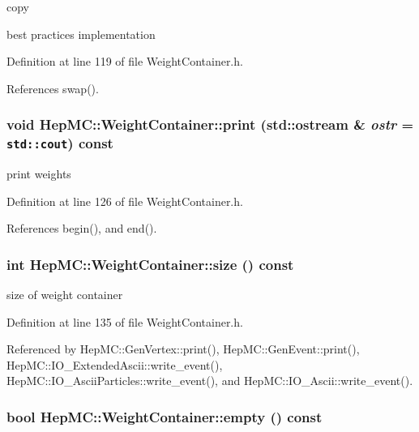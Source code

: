 copy 



best practices implementation 

Definition at line 119 of file Weight\-Container.h.

References swap().
\subsubsection{\setlength{\rightskip}{0pt plus 5cm}void Hep\-MC::Weight\-Container::print (std::ostream \& {\em ostr} = {\tt std::cout}) const\hspace{0.3cm}{\tt  [inline]}}\label{classHepMC_1_1WeightContainer_d3b1b9777a7ab2b600db4113aee2a8a3}


print weights 



Definition at line 126 of file Weight\-Container.h.

References begin(), and end().
\subsubsection{\setlength{\rightskip}{0pt plus 5cm}int Hep\-MC::Weight\-Container::size () const\hspace{0.3cm}{\tt  [inline]}}\label{classHepMC_1_1WeightContainer_43fbe772685a7052693a4bde78a2b93e}


size of weight container 



Definition at line 135 of file Weight\-Container.h.

Referenced by Hep\-MC::Gen\-Vertex::print(), Hep\-MC::Gen\-Event::print(), Hep\-MC::IO\_\-Extended\-Ascii::write\_\-event(), Hep\-MC::IO\_\-Ascii\-Particles::write\_\-event(), and Hep\-MC::IO\_\-Ascii::write\_\-event().
\subsubsection{\setlength{\rightskip}{0pt plus 5cm}bool Hep\-MC::Weight\-Container::empty () const\hspace{0.3cm}{\tt  [inline]}}\label{classHepMC_1_1WeightContainer_21748a37fd023eda5043a53f100c21e6}


